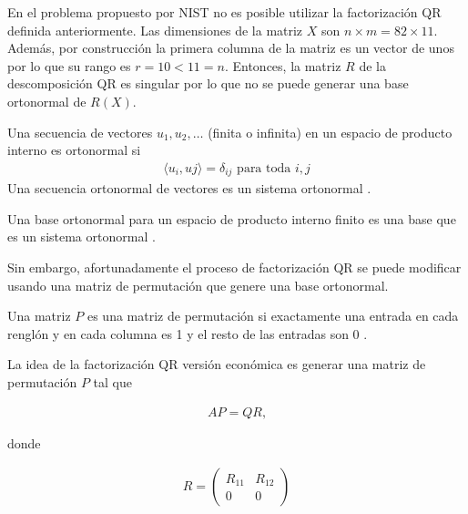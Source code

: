En el problema propuesto por NIST no es posible utilizar la factorización QR definida anteriormente. Las dimensiones de la matriz $X$ son $n \times m = 82 \times 11$. Además, por construcción la primera columna de la matriz es un vector de unos por lo que su rango es $r = 10 < 11 = n$. Entonces, la matriz $R$ de la descomposición QR es singular por lo que no se puede generar una base ortonormal de $R(X)$. 


 \begin{definition}
 Una secuencia de vectores $u_1, u_2, \dots$ (finita o infinita) en un espacio de producto interno es ortonormal si 
 \begin{equation*}
     \begin{aligned}
     \langle u_i , uj \rangle = \delta_{ij} \text{ para toda $i, j$}
     \end{aligned}
 \end{equation*}
 Una secuencia ortonormal de vectores es un sistema ortonormal \cite[p.~147]{garcia2017second}.
 \end{definition}

\begin{definition}
Una base ortonormal para un espacio de producto interno finito es una base que es un sistema ortonormal \cite[p.~149]{garcia2017second}.
\end{definition}

Sin embargo, afortunadamente el proceso de factorización QR se puede modificar usando una matriz de permutación que genere una base ortonormal.


\begin{definition}
Una matriz $P$ es una matriz de permutación si exactamente una entrada en cada renglón y en cada columna es 1 y el resto de las entradas son 0 \cite[p.~183]{garcia2017second}.
\end{definition}

La idea de la factorización QR versión económica es generar una matriz de permutación $P$ tal que 

\begin{equation*}
    \begin{aligned}
    AP = QR \text{,}
    \end{aligned}
\end{equation*}

donde 

\begin{equation*}
	\begin{aligned}
		R = 
		\begin{pmatrix}
			R_{11} & R_{12} \\
			0      & 0
		\end{pmatrix}
	\end{aligned}
\end{equation*}

